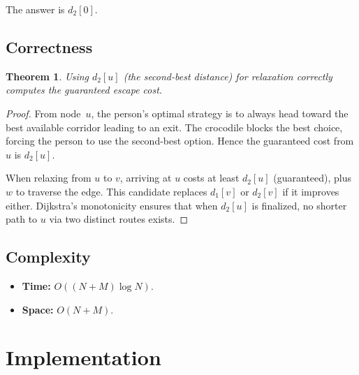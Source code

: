 \documentclass[11pt,a4paper]{article}
\newtheorem{theorem}{Theorem}
\begin{document}
The answer is $d_2[0]$.

\subsection{Correctness}

\begin{theorem}
Using $d_2[u]$ (the second-best distance) for relaxation correctly computes the guaranteed escape cost.
\end{theorem}
\begin{proof}
From node~$u$, the person's optimal strategy is to always head toward the best available corridor leading to an exit. The crocodile blocks the best choice, forcing the person to use the second-best option. Hence the guaranteed cost from $u$ is $d_2[u]$.

When relaxing from $u$ to $v$, arriving at $u$ costs at least $d_2[u]$ (guaranteed), plus $w$ to traverse the edge. This candidate replaces $d_1[v]$ or $d_2[v]$ if it improves either. Dijkstra's monotonicity ensures that when $d_2[u]$ is finalized, no shorter path to $u$ via two distinct routes exists.
\end{proof}

\subsection{Complexity}
\begin{itemize}
    \item \textbf{Time:} $O((N + M) \log N)$.
    \item \textbf{Space:} $O(N + M)$.
\end{itemize}

\section{Implementation}
\end{document}
